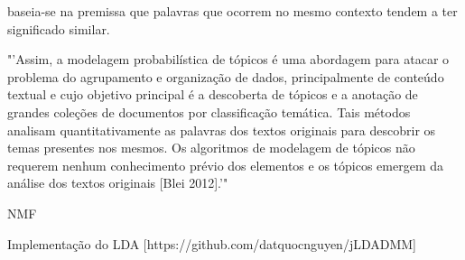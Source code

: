 baseia-se na premissa que palavras que ocorrem no mesmo contexto tendem a ter significado similar.




"'Assim, a modelagem probabilística de tópicos é uma abordagem para atacar o problema do agrupamento e organização de dados, principalmente de conteúdo textual e cujo objetivo principal é a descoberta de tópicos e a anotação de grandes coleções de documentos por classificação temática. Tais métodos analisam quantitativamente as palavras dos textos originais para descobrir os temas presentes nos mesmos. Os algoritmos de modelagem de tópicos não requerem nenhum conhecimento prévio dos elementos e os tópicos emergem da análise dos textos originais [Blei 2012].'"













NMF




Implementação do LDA
[https://github.com/datquocnguyen/jLDADMM]
